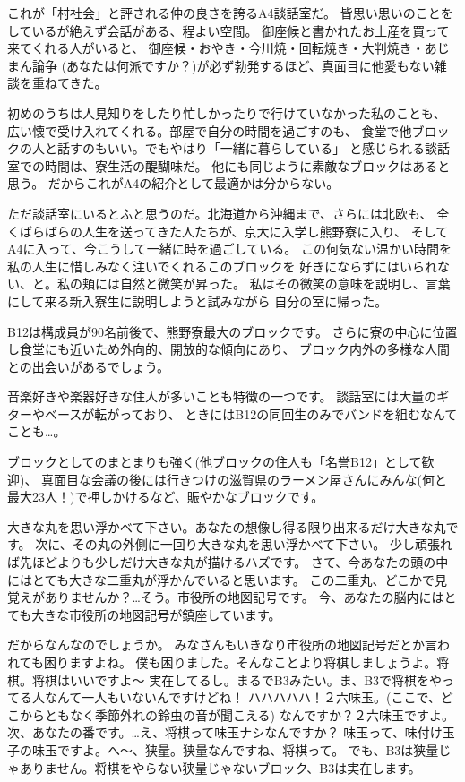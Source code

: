 これが「村社会」と評される仲の良さを誇るA4談話室だ。
皆思い思いのことをしているが絶えず会話がある、程よい空間。
御座候と書かれたお土産を買って来てくれる人がいると、
御座候・おやき・今川焼・回転焼き・大判焼き・あじまん論争
(あなたは何派ですか？)が必ず勃発するほど、真面目に他愛もない雑談を重ねてきた。

初めのうちは人見知りをしたり忙しかったりで行けていなかった私のことも、
広い懐で受け入れてくれる。部屋で自分の時間を過ごすのも、
食堂で他ブロックの人と話すのもいい。でもやはり「一緒に暮らしている」
と感じられる談話室での時間は、寮生活の醍醐味だ。
他にも同じように素敵なブロックはあると思う。
だからこれがA4の紹介として最適かは分からない。

ただ談話室にいるとふと思うのだ。北海道から沖縄まで、さらには北欧も、
全くばらばらの人生を送ってきた人たちが、京大に入学し熊野寮に入り、
そしてA4に入って、今こうして一緒に時を過ごしている。
この何気ない温かい時間を私の人生に惜しみなく注いでくれるこのブロックを
好きにならずにはいられない、と。私の頬には自然と微笑が昇った。
私はその微笑の意味を説明し、言葉にして来る新入寮生に説明しようと試みながら
自分の室に帰った。

\vspace{7mm}


B12は構成員が90名前後で、熊野寮最大のブロックです。
さらに寮の中心に位置し食堂にも近いため外向的、開放的な傾向にあり、
ブロック内外の多様な人間との出会いがあるでしょう。

音楽好きや楽器好きな住人が多いことも特徴の一つです。
談話室には大量のギターやベースが転がっており、
ときにはB12の同回生のみでバンドを組むなんてことも…。

ブロックとしてのまとまりも強く(他ブロックの住人も「名誉B12」として歓迎)、
真面目な会議の後には行きつけの滋賀県のラーメン屋さんにみんな(何と最大23人！)で押しかけるなど、賑やかなブロックです。

\vspace{7mm}


大きな丸を思い浮かべて下さい。あなたの想像し得る限り出来るだけ大きな丸です。
次に、その丸の外側に一回り大きな丸を思い浮かべて下さい。
少し頑張れば先ほどよりも少しだけ大きな丸が描けるハズです。
さて、今あなたの頭の中にはとても大きな二重丸が浮かんでいると思います。
この二重丸、どこかで見覚えがありませんか？…そう。市役所の地図記号です。
今、あなたの脳内にはとても大きな市役所の地図記号が鎮座しています。

だからなんなのでしょうか。
みなさんもいきなり市役所の地図記号だとか言われても困りますよね。
僕も困りました。そんなことより将棋しましょうよ。将棋。将棋はいいですよ～
実在してるし。まるでB3みたい。ま、B3で将棋をやってる人なんて一人もいないんですけどね！
ハハハハハ！２六味玉。(ここで、どこからともなく季節外れの鈴虫の音が聞こえる)
なんですか？２六味玉ですよ。次、あなたの番です。…え、将棋って味玉ナシなんですか？
味玉って、味付け玉子の味玉ですよ。へ～、狭量。狭量なんですね、将棋って。
でも、B3は狭量じゃありません。将棋をやらない狭量じゃないブロック、B3は実在します。


